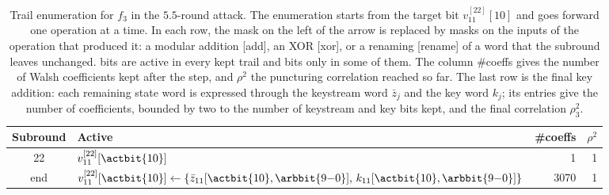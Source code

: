 \begin{table}[!htbp]
\centering
\footnotesize
\renewcommand{\arraystretch}{1.3}
\caption{Trail enumeration for $f_3$ in the $5.5$-round attack. The enumeration starts from the target bit $v^{[22]}_{11}[10]$ and goes forward one operation at a time. In each row, the mask on the left of the arrow is replaced by masks on the inputs of the operation that produced it: a modular addition [add], an XOR [xor], or a renaming [rename] of a word that the subround leaves unchanged.  bits are active in every kept trail and  bits only in some of them. The column \#coeffs gives the number of Walsh coefficients kept after the step, and $\rho^2$ the puncturing correlation reached so far. The last row is the final key addition: each remaining state word is expressed through the keystream word $\bar z_j$ and the key word $k_j$; its entries give the number of coefficients, bounded by two to the number of keystream and key bits kept, and the final correlation $\rho_3^2$.}
\label{tab:trail-55-f3}
\begin{tabular}{@{}c l r r@{}}
\toprule
Subround & Active & \#coeffs & $\rho^2$ \\
\midrule
22 & $v^{[22]}_{11}[\actbit{10}]$ & 1 & 1 \\
\midrule
end & $v^{[22]}_{11}[\actbit{10}] \leftarrow \{\bar z_{11}[\actbit{10},\arbbit{9{-}0}],\, k_{11}[\actbit{10},\arbbit{9{-}0}]\}$ & 3070 & 1 \\
\bottomrule
\end{tabular}
\end{table}
